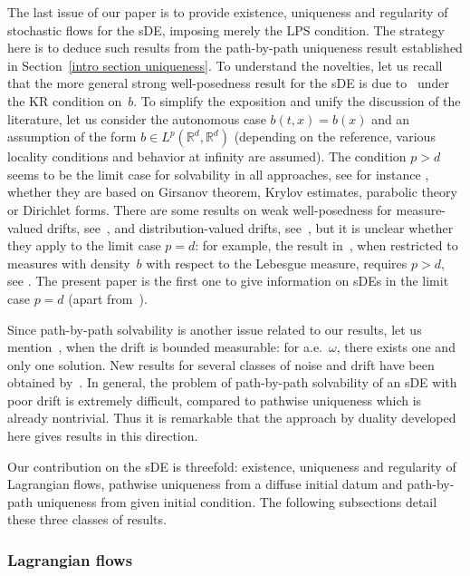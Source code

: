 \documentclass[a4paper,10pt]{article}
\newcommand\1{\mathbbm{1}}
\numberwithin{equation}{section}
\begin{document}
The last issue of our paper is to provide existence, uniqueness and regularity of stochastic flows for the sDE, imposing merely the LPS condition. The
strategy here is to deduce such results from the path-by-path uniqueness result established in Section~\ref{intro section uniqueness}. To understand the novelties, let us recall that the more general strong well-posedness result for the sDE is due to~\cite{KRYROE05} under the KR condition on~$b$. To simplify the exposition and unify the discussion of the literature, let us consider the autonomous case $b( t,x) =b( x) $ and an assumption of the form $b\in L^{p}( \mathbb{R}^{d},\mathbb{R}^{d}) $ (depending on the reference, various locality conditions and behavior at infinity are assumed). The condition $p>d$ seems to be the limit case for solvability in all approaches, see for instance \cite{KRYROE05,GYOMAR01,Po,ChZh,St}, whether they are based on Girsanov theorem, Krylov estimates, parabolic theory or Dirichlet forms. There are some results on weak well-posedness for measure-valued drifts, see~\cite{BASCHE03}, and distribution-valued drifts, see~\cite{FlaIssRus,DelDie,CanCho}, but it is unclear whether they apply to the limit case $p=d$: for example, the result in~\cite{BASCHE03}, when restricted to measures with density~$b$ with respect to the Lebesgue measure, requires $p>d$, see \cite[Example 2.3]{BASCHE03}. The present paper is the first one to give information on sDEs in the limit case $p=d$ (apart from~\cite{Nam,WLW}).

Since path-by-path solvability is another issue related to our results, let us mention~\cite{DAVIE07}, when the drift is bounded measurable: for a.e.~$\omega 
$, there exists one and only one solution. New results for several classes of noise and drift have been obtained by~\cite{CATGUB13}. In general, the problem of path-by-path solvability of an sDE with poor drift is extremely difficult, compared to pathwise uniqueness which is already nontrivial. Thus it is remarkable that the
approach by duality developed here gives results in this direction. 

Our contribution on the sDE is threefold: existence, uniqueness and regularity of Lagrangian flows, pathwise uniqueness from a diffuse initial datum and path-by-path uniqueness from given initial condition. The following subsections detail these three classes of results. 

\subsubsection{Lagrangian flows}
\end{document}
